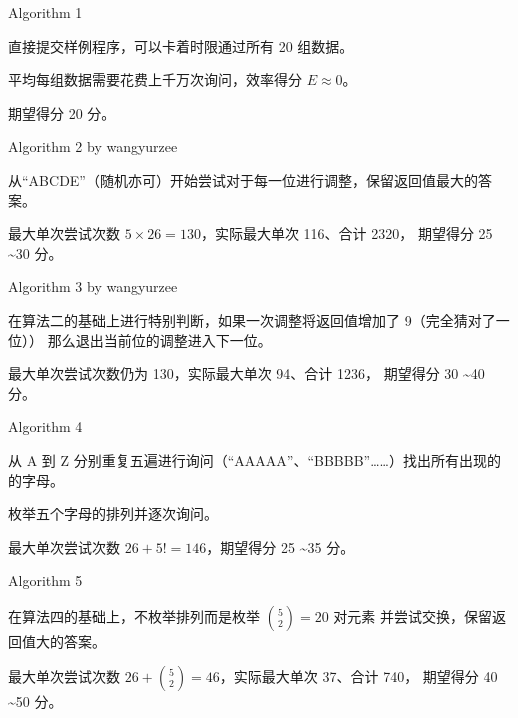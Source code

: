 \documentclass[UTF8]{beamer}
\begin{document}
\begin{frame}{Algorithm 1}

直接提交样例程序，可以卡着时限通过所有 20 组数据。

平均每组数据需要花费上千万次询问，效率得分 $E \approx 0$。\newline\newline

\pause 期望得分 20 分。

\end{frame}

\begin{frame}{Algorithm 2 by wangyurzee}

从“ABCDE”（随机亦可）开始尝试对于每一位进行调整，保留返回值最大的答案。\newline\newline

\pause 最大单次尝试次数 $5 \times 26 = 130$，实际最大单次 116、合计 2320，
期望得分 25 \textasciitilde 30 分。

\end{frame}

\begin{frame}{Algorithm 3 by wangyurzee}

在算法二的基础上进行特别判断，如果一次调整将返回值增加了 9（完全猜对了一位））%
那么退出当前位的调整进入下一位。\newline\newline

\pause 最大单次尝试次数仍为 130，实际最大单次 94、合计 1236，
期望得分 30 \textasciitilde 40 分。

\end{frame}

\begin{frame}{Algorithm 4}

从 A 到 Z 分别重复五遍进行询问（“AAAAA”、“BBBBB”……）找出所有出现的的字母。

枚举五个字母的排列并逐次询问。\newline\newline

\pause 最大单次尝试次数 $26 + 5! = 146$，期望得分 25 \textasciitilde 35 分。

\end{frame}

\begin{frame}{Algorithm 5}

在算法四的基础上，不枚举排列而是枚举 $\binom{5}{2} = 20$ 对元素%
并尝试交换，保留返回值大的答案。\newline\newline

\pause 最大单次尝试次数 $26 + \binom{5}{2} = 46$，实际最大单次 37、合计 740，
期望得分 40 \textasciitilde 50 分。

\end{frame}
\end{document}
